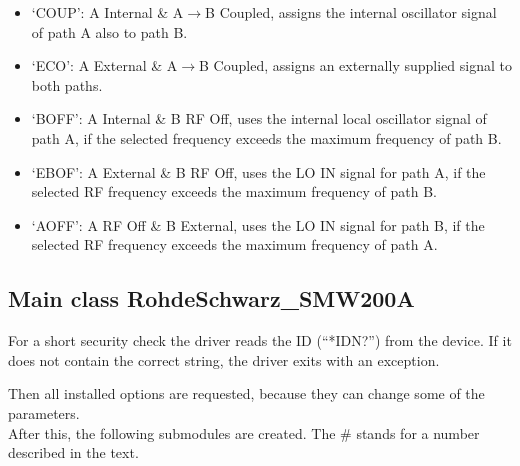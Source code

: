 \documentclass[11pt]{article} %
\begin{document}
\begin{itemize}
\begin{itemize}[]
	\item `COUP': A Internal \& A$\rightarrow$B Coupled, assigns the internal oscillator signal of path A also to path B.
	\item `ECO': A External \& A$\rightarrow$B Coupled, assigns an externally supplied signal to both paths.
	\item `BOFF': A Internal \& B RF Off, uses the internal local oscillator signal of path A, if the selected frequency exceeds the maximum frequency of path B.
	\item `EBOF': A External \& B RF Off, uses the LO IN signal for path A, if the selected RF frequency exceeds the maximum frequency of path B.
	\item `AOFF': A RF Off \& B External, uses the LO IN signal for path B, if the selected RF frequency exceeds the maximum frequency of path A.
	\end{itemize}
\end{itemize}


\subsection{Main class RohdeSchwarz\_SMW200A}

For a short security check the driver reads the ID (``*IDN?'') from the device. If it does not contain the correct string, the driver exits with an exception.

Then all installed options are requested, because they can change some of the parameters.
\ \\

After this, the following submodules are created. The \# stands for a number described in the text.
\end{document}
